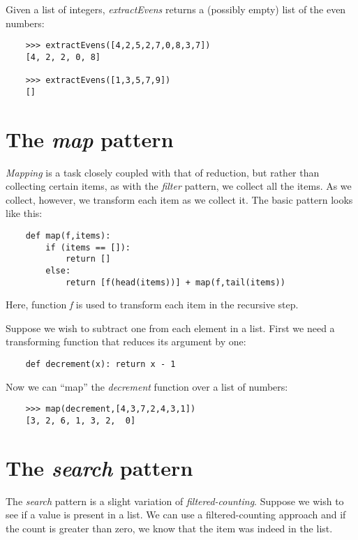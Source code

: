 Given a list of integers, {\it extractEvens} returns a (possibly empty)
list of the even numbers:

\begin{verbatim}
    >>> extractEvens([4,2,5,2,7,0,8,3,7])
    [4, 2, 2, 0, 8]

    >>> extractEvens([1,3,5,7,9])
    []
\end{verbatim}

\section{The {\it map} pattern}

{\it Mapping} is a task closely coupled with that
of reduction, but rather than collecting
certain items, as with the {\it filter} pattern, we
collect all the items. As we collect, however,
we transform each item as
we collect it. The basic pattern looks like this:

\begin{verbatim}
    def map(f,items):
        if (items == []): 
            return []
        else:
            return [f(head(items))] + map(f,tail(items))
\end{verbatim}

Here, function {\it f} is used to transform each item in the
recursive step.

Suppose we wish to subtract one from each element in a list.
First we need a transforming function that reduces its argument
by one:

\begin{verbatim}
    def decrement(x): return x - 1
\end{verbatim}

Now we can ``map'' the {\it decrement} function over a list of numbers:

\begin{verbatim}
    >>> map(decrement,[4,3,7,2,4,3,1])
    [3, 2, 6, 1, 3, 2,  0]
\end{verbatim}

\section{The {\it search} pattern}

The {\it search} pattern is a slight variation of {\it filtered-counting}.
Suppose we wish to see if a value is present in a list. We can
use a filtered-counting approach and if the count is greater than
zero, we know that the item was indeed in the list.

